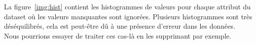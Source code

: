 \documentclass[12pt]{article}
\renewcommand{\cite}{\parencite}
\newcommand\mimic{\texttt{MIMIC-III} }
\newcommand{\figref}[1]{figure~\ref{#1}}
\begin{document}
La \figref{img:hist} contient les histogrammes de valeurs pour chaque attribut
du dataset où les valeurs manquantes sont ignorées. Plusieurs histogrammes sont
très déséquilibrés, cela est peut-être dû à une présence d'erreur dans les
données. Nous pourrions essayer de traiter ces cas-là en les supprimant par
exemple.


%
%
%
\end{document}
